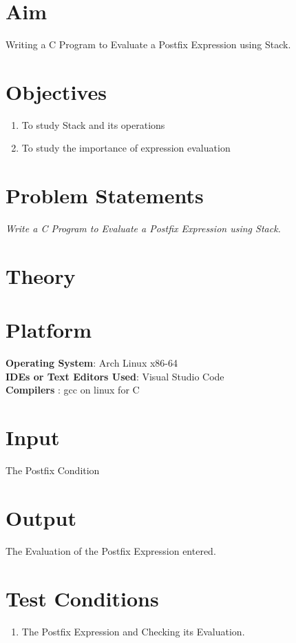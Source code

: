 \documentclass[11pt]{article}
\begin{document}
\tableofcontents
\thispagestyle{empty}
\clearpage
\setcounter{page}{1}

\section{Aim}
Writing a C Program to Evaluate a Postfix Expression using Stack.
\section{Objectives}
\begin{enumerate}
	\item To study Stack and its operations
	\item To study the importance of expression evaluation
\end{enumerate}

\section{Problem Statements}
\textit{Write a C Program to Evaluate a Postfix Expression using Stack. }

\section{Theory}

\section{Platform}
\textbf{Operating System}: Arch Linux x86-64 \\
\textbf{IDEs or Text Editors Used}: Visual Studio Code\\
\textbf{Compilers} : gcc on linux for C\\

\section{Input}
The Postfix Condition
\section{Output}
The Evaluation of the Postfix Expression entered.
\section{Test Conditions}
\begin{enumerate}
	\item The Postfix Expression and Checking its Evaluation.
\end{enumerate}
\end{document}
